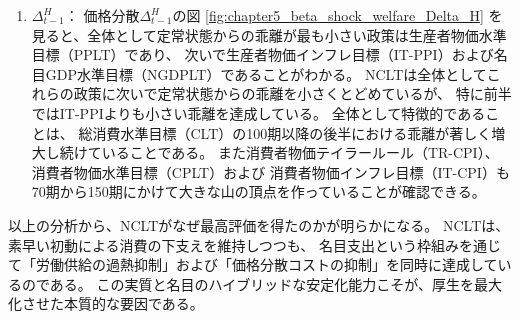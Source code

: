 \begin{enumerate}
        100期までの前半においてNCLTはPPLTおよびIT-PPIに次いで乖離が小さい。
        100期以降の後半においてもNCLTはPPLTおよびIT-PPIに次ぐ
        名目GDP水準目標（NGDPLT）や生産者物価テイラールールと同程度の乖離の小ささを達成している。
        また後半の特徴として、生産水準目標（CLT）の乖離が大きい水準で安定的にとどまっていることが見て取れる。
    \item
    \label{itm:chapter5_beta_shock_policies_nclt_Delta_t_minus_1_H}
        \(\Delta_{t-1}^H\)：
        価格分散\(\Delta_{t-1}^H\)の図
        \ref{fig:chapter5_beta_shock_welfare_Delta_H}
        を見ると、全体として定常状態からの乖離が最も小さい政策は生産者物価水準目標（PPLT）であり、
        次いで生産者物価インフレ目標（IT-PPI）および名目GDP水準目標（NGDPLT）であることがわかる。
        NCLTは全体としてこれらの政策に次いで定常状態からの乖離を小さくとどめているが、
        特に前半ではIT-PPIよりも小さい乖離を達成している。
        全体として特徴的であることは、
        総消費水準目標（CLT）の100期以降の後半における乖離が著しく増大し続けていることである。
        また消費者物価テイラールール（TR-CPI）、消費者物価水準目標（CPLT）および
        消費者物価インフレ目標（IT-CPI）も70期から150期にかけて大きな山の頂点を作っていることが確認できる。
\end{enumerate}
以上の分析から、NCLTがなぜ最高評価を得たのかが明らかになる。
NCLTは、素早い初動による消費の下支えを維持しつつも、
名目支出という枠組みを通じて「労働供給の過熱抑制」および「価格分散コストの抑制」を同時に達成しているのである。
この実質と名目のハイブリッドな安定化能力こそが、厚生を最大化させた本質的な要因である。